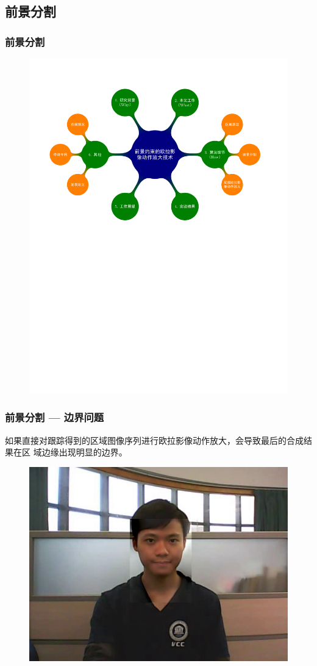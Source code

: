\documentclass[xcolor=svgnames,serif,table]{beamer}
\begin{document}
\subsection{前景分割}

\begin{frame}
  \frametitle{前景分割}
  \vspace{-2.5em}
  \begin{figure}
    \centering
    \includegraphics[width=\textwidth, page=6]{mindmap.pdf}
  \end{figure}
\end{frame}

\begin{frame}
  \frametitle{前景分割 --- 边界问题}
  \small
  如果直接对跟踪得到的区域图像序列进行欧拉影像动作放大，会导致最后的合成结果在区
  域边缘出现明显的边界。

  \begin{figure}[htbp]
    \centering
    \includegraphics[width=.5\textwidth]{bound-artifact.png}
  \end{figure}
\end{frame}
\end{document}
